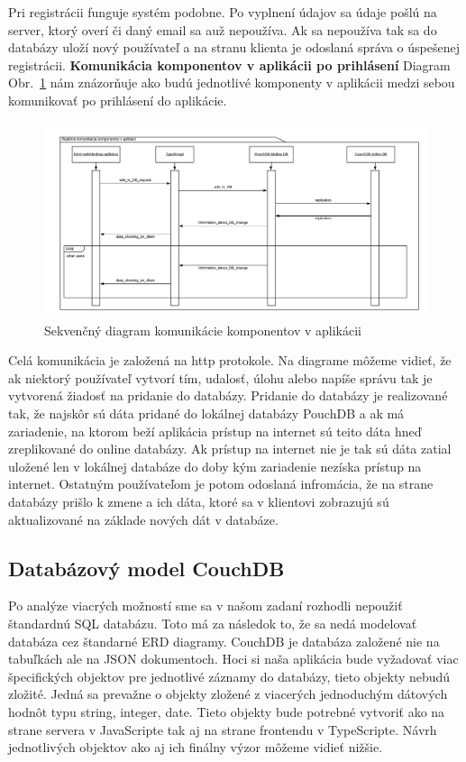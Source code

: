 \indent Pri registrácii funguje systém podobne. Po vyplnení údajov sa údaje pošlú na server, ktorý overí či daný email sa auž nepoužíva. Ak sa nepoužíva tak sa do databázy uloží nový používateľ a na stranu klienta je odoslaná správa o úspešenej registrácii. 
\newpage
\textbf{Komunikácia komponentov v aplikácii po prihlásení} \newline
\indent Diagram Obr.~\ref{fig:seq_com} nám znázorňuje ako budú jednotlivé komponenty v aplikácii medzi sebou komunikovať po prihlásení do aplikácie.
\begin{figure}[H]
    \centering
    \includegraphics[scale=0.50]{img/seq_tim.png}
    \caption{Sekvenčný diagram komunikácie komponentov v aplikácii}
    \label{fig:seq_com}
\end{figure}

\indent Celá komunikácia je založená na http protokole. Na diagrame môžeme vidieť, že ak niektorý používateľ vytvorí tím, udalosť, úlohu alebo napíše správu tak je vytvorená žiadosť na pridanie do databázy. Pridanie do databázy je realizované tak, že najskôr sú dáta pridané do lokálnej databázy PouchDB a ak má zariadenie, na ktorom beží aplikácia prístup na internet sú teito dáta hneď zreplikované do online databázy. Ak prístup na internet nie je tak sú dáta zatial uložené len v lokálnej databáze do doby kým zariadenie nezíska prístup na internet. Ostatným používateľom je potom odoslaná infromácia, že na strane databázy prišlo k zmene a ich dáta, ktoré sa v klientovi zobrazujú sú aktualizované na základe nových dát v databáze.  

\subsection{Databázový model CouchDB}
\indent Po analýze viacrých možností sme sa v našom zadaní rozhodli nepoužiť štandardnú SQL databázu. Toto má za následok to, že sa nedá modelovať databáza cez štandarné ERD diagramy. CouchDB je databáza založené nie na tabuľkách ale na JSON dokumentoch. Hoci si naša aplikácia bude vyžadovať viac špecifických objektov pre jednotlivé záznamy do databázy, tieto objekty nebudú zložité. Jedná sa prevažne o objekty zložené z viacerých jednoduchým dátových hodnôt typu string, integer, date. Tieto objekty bude potrebné vytvoriť ako na strane servera v JavaScripte tak aj na strane frontendu v TypeScripte. Návrh jednotlivých objektov ako aj ich finálny výzor môžeme vidieť nižšie. 

